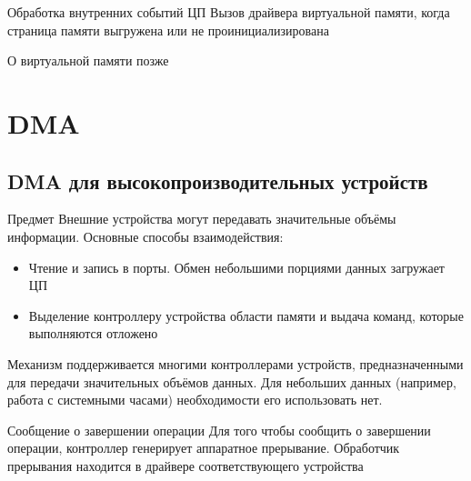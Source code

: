 \documentclass[xetex,aspectratio=43]{beamer}
\begin{document}
\begin{frame}
	\begin{block}{Обработка внутренних событий ЦП}
		Вызов драйвера виртуальной памяти, когда страница памяти выгружена или
		не проинициализирована
		
		\pause
		
		О виртуальной памяти позже
		
	\end{block}
\end{frame}

\section{DMA}

\subsection{DMA для высокопроизводительных устройств}

\begin{frame}
	\begin{block}{Предмет}
		Внешние устройства могут передавать значительные объёмы информации.
		Основные способы взаимодействия:
		
		\begin{itemize}
			\tightlist
			\item
			Чтение и запись в порты. Обмен небольшими порциями данных загружает ЦП
			\item
			Выделение контроллеру устройства области памяти и выдача команд,
			которые выполняются отложено
		\end{itemize}
		
		\pause
		
		
		Механизм поддерживается многими контроллерами устройств,
		предназначенными для передачи значительных объёмов данных. Для небольших данных (например, работа с системными часами) необходимости его использовать нет.
	\end{block}
\end{frame}

\begin{frame}
	\begin{block}{Сообщение о завершении операции}
		Для того чтобы сообщить о завершении операции, контроллер генерирует
		аппаратное прерывание. Обработчик прерывания находится в драйвере
		соответствующего устройства
	\end{block}
\end{frame}
\end{document}
